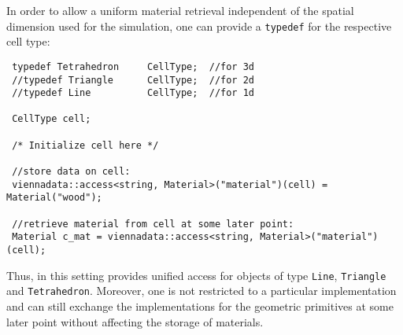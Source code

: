 In order to allow a uniform material retrieval independent of the spatial dimension used for the simulation, one can provide a \lstinline|typedef| for the respective cell type:
\begin{lstlisting}
 typedef Tetrahedron     CellType;  //for 3d
 //typedef Triangle      CellType;  //for 2d
 //typedef Line          CellType;  //for 1d

 CellType cell;

 /* Initialize cell here */

 //store data on cell:
 viennadata::access<string, Material>("material")(cell) = Material("wood"); 

 //retrieve material from cell at some later point:
 Material c_mat = viennadata::access<string, Material>("material")(cell); 
\end{lstlisting}
Thus, in this setting {\ViennaData} provides unified access for objects of type \lstinline|Line|, \lstinline|Triangle| and \lstinline|Tetrahedron|. 
Moreover, one is not restricted to a particular implementation and can still exchange the implementations for the geometric primitives at some later point without affecting the storage of materials.


